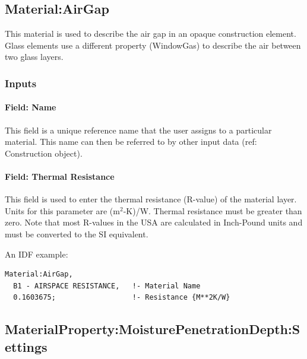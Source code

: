 \subsection{Material:AirGap}\label{materialairgap}

This material is used to describe the air gap in an opaque construction element. Glass elements use a different property (WindowGas) to describe the air between two glass layers.

\subsubsection{Inputs}\label{inputs-3-036}

\paragraph{Field: Name}\label{field-name-3-031}

This field is a unique reference name that the user assigns to a particular material. This name can then be referred to by other input data (ref: Construction object).

\paragraph{Field: Thermal Resistance}\label{field-thermal-resistance-1}

This field is used to enter the thermal resistance (R-value) of the material layer. Units for this parameter are (m\(^{2}\)-K)/W. Thermal resistance must be greater than zero. Note that most R-values in the USA are calculated in Inch-Pound units and must be converted to the SI equivalent.

An IDF example:

\begin{lstlisting}
Material:AirGap,
  B1 - AIRSPACE RESISTANCE,   !- Material Name
  0.1603675;                  !- Resistance {M**2K/W}
\end{lstlisting}

\subsection{MaterialProperty:MoisturePenetrationDepth:Settings}\label{materialpropertymoisturepenetrationdepthsettings}

